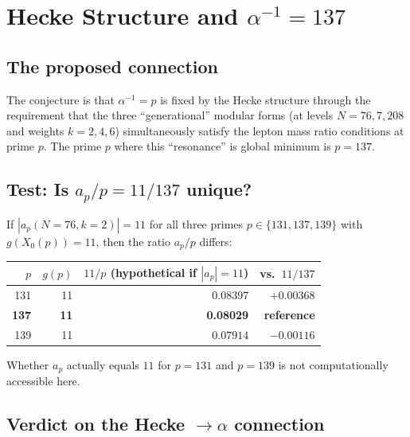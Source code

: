 \documentclass[12pt,a4paper]{article}
\theoremstyle{definition}
\theoremstyle{remark}
\begin{document}
\section{Hecke Structure and $\alpha^{-1} = 137$}
\label{sec:hecke:alpha}

\subsection{The proposed connection}

The conjecture is that $\alpha^{-1} = p$ is fixed by the Hecke structure
through the requirement that the three ``generational'' modular forms
(at levels $N=76, 7, 208$ and weights $k=2, 4, 6$) simultaneously satisfy
the lepton mass ratio conditions at prime $p$.  The prime $p$ where this
``resonance'' is global minimum is $p=137$.

\subsection{Test: Is $a_p/p = 11/137$ unique?}

If $|a_p(N=76, k=2)| = 11$ for all three primes $p \in \{131, 137, 139\}$
with $g(X_0(p))=11$, then the ratio $a_p/p$ differs:

\begin{center}
\begin{tabular}{rrrr}
  \toprule
  $p$ & $g(p)$ & $11/p$ (hypothetical if $|a_p|=11$) & vs.\ $11/137$ \\
  \midrule
  131 & 11 & $0.08397$ & $+0.00368$ \\
  \textbf{137} & \textbf{11} & \textbf{0.08029} & \textbf{reference} \\
  139 & 11 & $0.07914$ & $-0.00116$ \\
  \bottomrule
\end{tabular}
\end{center}

\noindent Whether $a_p$ actually equals $11$ for $p=131$ and $p=139$ is not
computationally accessible here.

\subsection{Verdict on the Hecke $\to \alpha$ connection}
\end{document}
